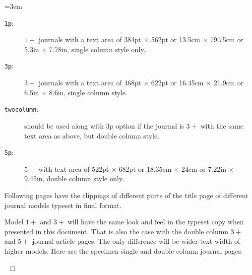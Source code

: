 \documentclass[a4paper,12pt]{article}
\begin{document}
\lmrgn=3em
\begin{description}
\item [\texttt{1p}:] $1+$ journals with a text area of
384pt $\times$ 562pt or 13.5cm $\times$ 19.75cm or 5.3in $\times$
7.78in, single column style only.

\item [\texttt{3p}:] $3+$ journals with a text area of 468pt
$\times$ 622pt or 16.45cm $\times$ 21.9cm or 6.5in $\times$
8.6in, single column style.

\item [\texttt{twocolumn}:] should be used along with 3p option if the
journal is $3+$ with the same text area as above, but double column
style.

\item [\texttt{5p}:] $5+$ with text area of 522pt $\times$
682pt or 18.35cm $\times$ 24cm or 7.22in $\times$ 9.45in,
double column style only.
\end{description}

Following pages have the clippings of different parts of
the title page of different journal models typeset in final
format.

Model $1+$ and $3+$  will have the same look and
feel in the typeset copy when presented in this document. That is
also the case with the double column $3+$ and $5+$ journal article
pages. The only difference will be wider text width of
higher models.  Here are the specimen single and double column journal
pages.

\vspace*{-.5pc}

\enlargethispage*{\baselineskip}

\src{}\hypertarget{sc}{}
\def\rulecolor{blue!70}
\hyperlink{bsc}{}
\def\rulecolor{orange}

\src{}\hypertarget{dc}{}
\def\rulecolor{blue!70}
\hyperlink{bsc}{}
\def\rulecolor{orange}

~\hfill $\Box$
\end{document}
